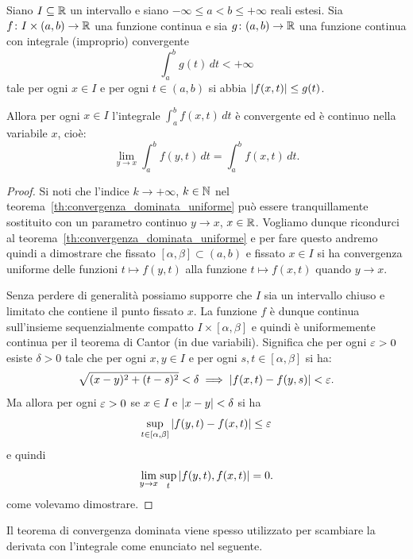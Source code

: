 \begin{theorem}
  \label{th:convergenza_dominata}%
  \mymark{**}%
Siano $I\subseteq {\mathbb R}$ un intervallo e siano 
$-\infty \le a < b \le +\infty$ reali estesi.
Sia $f\colon I \times(a,b)\to {\mathbb R}$ una funzione continua 
e sia $g\colon(a,b)\to {\mathbb R}$ una funzione continua con integrale 
(improprio) convergente
\[
 \int_a^b g(t)\, dt < +\infty
\]
tale per ogni $x\in I$ e per ogni $t\in(a,b)$ si abbia ${\left|f(x,t)\right|} \le g(t)$.

Allora per ogni $x\in I$ l'integrale $\int_a^b f(x,t)\, dt$ è convergente ed è continuo 
nella variabile $x$, cioè:
\[
  \lim_{y\to x} \int_a^b f(y,t)  \, dt 
  = \int_a^b f(x,t)\, dt.
\]
\end{theorem}
%
\begin{proof}
Si noti che l'indice $k\to +\infty$, $k\in {\mathbb N}$ 
nel teorema~\ref{th:convergenza_dominata_uniforme} 
può essere tranquillamente sostituito con 
un parametro continuo $y\to x$, $x\in {\mathbb R}$.
Vogliamo dunque ricondurci al teorema~\ref{th:convergenza_dominata_uniforme} 
e per fare questo andremo quindi a dimostrare che fissato $[\alpha,\beta]\subset (a,b)$ 
e fissato $x\in I$ si ha convergenza uniforme 
delle funzioni $t\mapsto f(y,t)$ alla funzione $t\mapsto f(x,t)$
quando $y\to x$. 

Senza perdere di generalità possiamo supporre che $I$ sia un intervallo chiuso e limitato 
che contiene il punto fissato $x$. 
La funzione $f$ è dunque continua sull'insieme sequenzialmente compatto $I\times [\alpha,\beta]$ 
e quindi è uniformemente continua
per il teorema di Cantor (in due variabili).
Significa che per ogni $\varepsilon>0$ esiste $\delta>0$ tale che per ogni $x,y\in I$ 
e per ogni $s,t\in[\alpha,\beta]$ si ha:
\[
\sqrt{(x-y)^2+(t-s)^2} < \delta \implies {\left|f(x,t)-f(y,s)\right|} < \varepsilon.  
\]
Ma allora per ogni $\varepsilon>0$ se $x\in I$ e ${\left|x-y\right|} < \delta$ si ha 
\[
  \sup_{t\in\left[\alpha,\beta\right]} {\left|f(y,t)-f(x,t)\right|} \le \varepsilon
\]
e quindi
\[
  \lim_{y\to x}  \sup_t {\left|f(y,t), f(x,t)\right|} = 0.
\]
come volevamo dimostrare.
\end{proof}
%
Il teorema di convergenza dominata viene spesso utilizzato 
per scambiare la derivata con l'integrale come enunciato nel seguente.
%
